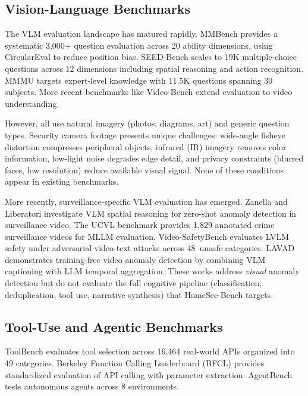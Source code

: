 \documentclass[conference]{IEEEtran}
\begin{document}
\subsection{Vision-Language Benchmarks}
The VLM evaluation landscape has matured rapidly. MMBench
\cite{liu2023mmbench} provides a systematic 3,000+ question evaluation
across 20 ability dimensions, using CircularEval to reduce position bias.
SEED-Bench \cite{li2023seedbench} scales to 19K multiple-choice questions
across 12 dimensions including spatial reasoning and action recognition.
MMMU \cite{yue2024mmmu} targets expert-level knowledge with 11.5K
questions spanning 30 subjects. More recent benchmarks like Video-Bench
\cite{ning2023videobench} extend evaluation to video understanding.

However, all use natural imagery (photos, diagrams, art) and generic
question types. Security camera footage presents unique challenges:
wide-angle fisheye distortion compresses peripheral objects, infrared
(IR) imagery removes color information, low-light noise degrades edge
detail, and privacy constraints (blurred faces, low resolution) reduce
available visual signal. None of these conditions appear in existing
benchmarks.

More recently, surveillance-specific VLM evaluation has emerged.
Zanella and Liberatori \cite{zanella2024vlmsurveillance} investigate
VLM spatial reasoning for zero-shot anomaly detection in surveillance
video. The UCVL benchmark \cite{wu2024ucvl} provides 1,829 annotated
crime surveillance videos for MLLM evaluation. Video-SafetyBench
\cite{yuan2024videosafety} evaluates LVLM safety under adversarial
video-text attacks across 48~unsafe categories. LAVAD
\cite{zanella2024lavad} demonstrates training-free video anomaly
detection by combining VLM captioning with LLM temporal aggregation.
These works address \emph{visual} anomaly detection but do not
evaluate the full cognitive pipeline (classification, deduplication,
tool use, narrative synthesis) that HomeSec-Bench targets.

\subsection{Tool-Use and Agentic Benchmarks}
ToolBench \cite{qin2023toolllm} evaluates tool selection across 16,464
real-world APIs organized into 49 categories. Berkeley Function Calling
Leaderboard (BFCL) \cite{berkeley2024bfcl} provides standardized
evaluation of API calling with parameter extraction. AgentBench
\cite{liu2023agentbench} tests autonomous agents across 8 environments.
\end{document}
